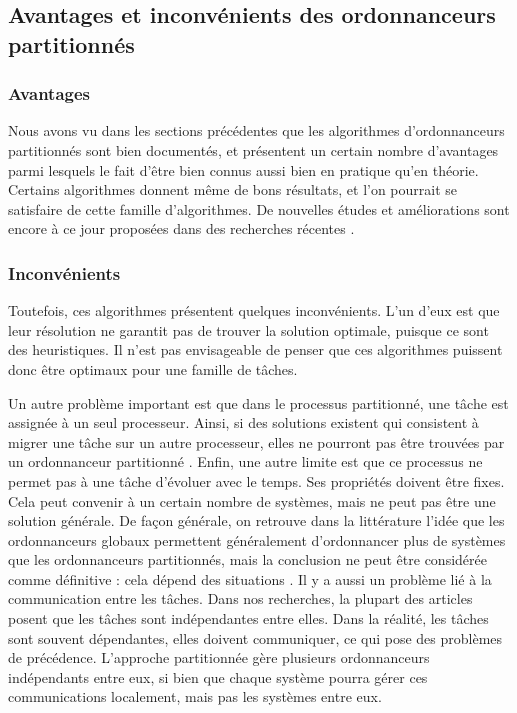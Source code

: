 	\subsection{Avantages et inconvénients des ordonnanceurs partitionnés}
	\subsubsection{Avantages}
	Nous avons vu dans les sections précédentes que les algorithmes d'ordonnanceurs 
	partitionnés sont bien documentés, et présentent un certain nombre d'avantages parmi lesquels 
	le fait d'être bien connus aussi bien en pratique qu'en théorie. 
	Certains algorithmes donnent même de bons résultats, et l'on pourrait se satisfaire de 
	cette famille d'algorithmes. De nouvelles études et améliorations sont encore à ce jour proposées 
	dans des recherches récentes \cite{rodriguez_paul_multi-criteria_2013}.\medskip
	
	\subsubsection{Inconvénients}
	Toutefois, ces algorithmes présentent quelques inconvénients. 
	L'un d'eux est que leur résolution ne garantit pas de trouver la solution optimale, 
	puisque ce sont des heuristiques. 
	Il n'est pas envisageable de penser 
	que ces algorithmes puissent donc être optimaux pour une famille de tâches.
	
	Un autre problème important est que dans le processus partitionné, une tâche est 
	assignée à un seul processeur. 
	Ainsi, si des solutions existent qui consistent à migrer une tâche sur un autre processeur, 
	elles ne pourront pas être trouvées 
	par un ordonnanceur partitionné \cite{ramamurthy_static-priority_2000}. 
	Enfin, une autre limite est que ce processus ne permet pas à une tâche d'évoluer avec le temps. 
	Ses propriétés doivent être fixes. 
	Cela peut convenir à un certain nombre de systèmes, mais ne peut pas être une solution générale.
	De façon générale, on retrouve dans la littérature l'idée que les ordonnanceurs globaux 
	permettent généralement d'ordonnancer plus de systèmes que les ordonnanceurs partitionnés, 
	mais la conclusion ne peut être considérée comme définitive : cela dépend des situations
	\cite{lopez_utilization_2004}.
	Il y a aussi un problème lié à la communication entre les tâches. Dans nos recherches, 
	la plupart des articles posent que les tâches sont indépendantes entre elles. Dans 
	la réalité, les tâches sont souvent dépendantes, elles doivent communiquer, ce qui pose 
	des problèmes de précédence. 
	L'approche partitionnée gère plusieurs ordonnanceurs indépendants entre eux, si bien 
	que chaque système pourra gérer ces communications localement, mais pas les systèmes entre eux. 
	\medskip
	
